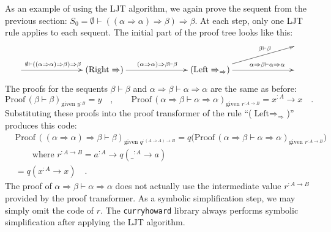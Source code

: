 As an example of using the LJT algorithm, we again prove the sequent
from the previous section: $S_{0}=\emptyset\vdash((\alpha\Rightarrow\alpha)\Rightarrow\beta)\Rightarrow\beta$.
At each step, only one LJT rule applies to each sequent. The initial
part of the proof tree looks like this:\vspace{-1\baselineskip}
\[
\xymatrix{\xyScaleY{1.5pc}\xyScaleX{6pc} &  &  & ~\\
\ar[r]\sp(0.4){\emptyset\vdash((\alpha\Rightarrow\alpha)\Rightarrow\beta)\Rightarrow\beta} & (\text{Right}\Rightarrow)\ar[r]\sp(0.5){(\alpha\Rightarrow\alpha)\Rightarrow\beta\vdash\beta} & (\text{Left}\Rightarrow_{\Rightarrow})\ar[ru]\sp(0.65){\beta\vdash\beta}\ar[r]\sp(0.65){\alpha\Rightarrow\beta\vdash\alpha\Rightarrow\alpha} & ~
}
\]
The proofs for the sequents $\beta\vdash\beta$ and $\alpha\Rightarrow\beta\vdash\alpha\Rightarrow\alpha$
are the same as before:
\[
\text{Proof}\,(\beta\vdash\beta)_{\text{given }y^{:B}}=y\quad,\quad\quad\text{Proof}\,(\alpha\Rightarrow\beta\vdash\alpha\Rightarrow\alpha)_{\text{given }r^{:A\rightarrow B}}=x^{:A}\rightarrow x\quad.
\]
Substituting these proofs into the proof transformer of the rule \textsf{``}($\text{Left}\Rightarrow_{\Rightarrow}$)\textsf{''}
produces this code:
\begin{align*}
 & \text{Proof}\,((\alpha\Rightarrow\alpha)\Rightarrow\beta\vdash\beta)_{\text{given }q^{:(A\rightarrow A)\rightarrow B}}=q\big(\text{Proof}\,(\alpha\Rightarrow\beta\vdash\alpha\Rightarrow\alpha)_{\text{given }r^{:A\rightarrow B}}\big)\\
 & \quad\quad\text{where }r^{:A\rightarrow B}=a^{:A}\rightarrow q(\_^{:A}\rightarrow a)\\
 & =q(x^{:A}\rightarrow x)\quad.
\end{align*}
The proof of $\alpha\Rightarrow\beta\vdash\alpha\Rightarrow\alpha$
does not actually use the intermediate value $r^{:A\rightarrow B}$
provided by the proof transformer. As a symbolic simplification step,
we may simply omit the code of $r$. The \lstinline!curryhoward!
library always performs symbolic simplification after applying the
LJT algorithm. 

